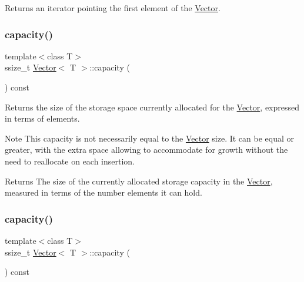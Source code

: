 Returns an iterator pointing the first element of the \hyperlink{classVector}{Vector}. \mbox{\label{classVector_a83893154a5d9c5cf0f4f12146371212b}} 
\subsubsection{\texorpdfstring{capacity()}{capacity()}\hspace{0.1cm}{\footnotesize\ttfamily [1/2]}}
{\footnotesize\ttfamily template$<$class T$>$ \\
ssize\+\_\+t \hyperlink{classVector}{Vector}$<$ T $>$\+::capacity (\begin{DoxyParamCaption}{ }\end{DoxyParamCaption}) const\hspace{0.3cm}{\ttfamily [inline]}}



Returns the size of the storage space currently allocated for the \hyperlink{classVector}{Vector}, expressed in terms of elements. 

\begin{DoxyNote}{Note}
This capacity is not necessarily equal to the \hyperlink{classVector}{Vector} size. It can be equal or greater, with the extra space allowing to accommodate for growth without the need to reallocate on each insertion. 
\end{DoxyNote}
\begin{DoxyReturn}{Returns}
The size of the currently allocated storage capacity in the \hyperlink{classVector}{Vector}, measured in terms of the number elements it can hold. 
\end{DoxyReturn}
\mbox{\label{classVector_a83893154a5d9c5cf0f4f12146371212b}} 
\subsubsection{\texorpdfstring{capacity()}{capacity()}\hspace{0.1cm}{\footnotesize\ttfamily [2/2]}}
{\footnotesize\ttfamily template$<$class T$>$ \\
ssize\+\_\+t \hyperlink{classVector}{Vector}$<$ T $>$\+::capacity (\begin{DoxyParamCaption}{ }\end{DoxyParamCaption}) const\hspace{0.3cm}{\ttfamily [inline]}}



